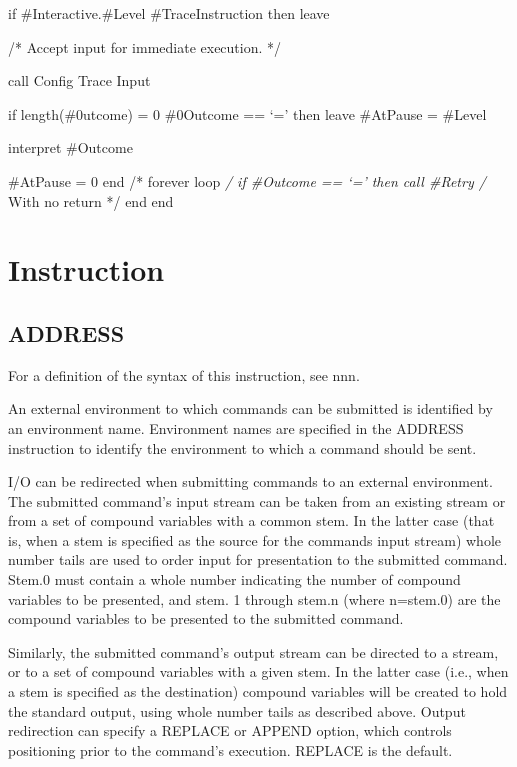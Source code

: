 if \#Interactive.\#Level \textbar{} \#TraceInstruction then leave

/* Accept input for immediate execution. */

call Config Trace Input

if length(\#0utcome) = 0 \textbar{} \#0Outcome == `=' then leave
\#AtPause = \#Level

interpret \#Outcome

\#AtPause = 0 end /* forever loop \emph{/ if \#Outcome == `=' then call
\#Retry /} With no return */ end end

\hypertarget{instruction}{%
\section{Instruction}\label{instruction}}

\hypertarget{address}{%
\subsection{ADDRESS}\label{address}}

For a definition of the syntax of this instruction, see nnn.

An external environment to which commands can be submitted is identified
by an environment name. Environment names are specified in the ADDRESS
instruction to identify the environment to which a command should be
sent.

I/O can be redirected when submitting commands to an external
environment. The submitted command's input stream can be taken from an
existing stream or from a set of compound variables with a common stem.
In the latter case (that is, when a stem is specified as the source for
the commands input stream) whole number tails are used to order input
for presentation to the submitted command. Stem.0 must contain a whole
number indicating the number of compound variables to be presented, and
stem. 1 through stem.n (where n=stem.0) are the compound variables to be
presented to the submitted command.

Similarly, the submitted command's output stream can be directed to a
stream, or to a set of compound variables with a given stem. In the
latter case (i.e., when a stem is specified as the destination) compound
variables will be created to hold the standard output, using whole
number tails as described above. Output redirection can specify a
REPLACE or APPEND option, which controls positioning prior to the
command's execution. REPLACE is the default.

